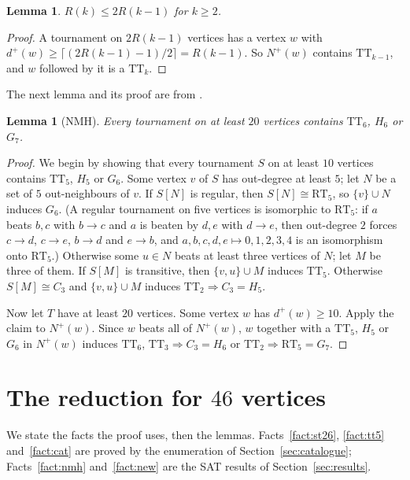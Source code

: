 \documentclass[11pt]{amsart}
\newtheorem{lemma}[theorem]{Lemma}
\theoremstyle{definition}
\theoremstyle{remark}
\newcommand{\TT}[1]{\mathrm{TT}_{#1}}
\newcommand{\RT}{\mathrm{RT}_5}
\newcommand{\dom}{\Rightarrow}
\newcommand{\Np}{N^{+}}
\newcommand{\dpl}{d^{+}}
\begin{document}
\begin{lemma}\label{lem:double}
$R(k) \le 2R(k-1)$ for $k \ge 2$.
\end{lemma}

\begin{proof}
A tournament on $2R(k-1)$ vertices has a vertex $w$ with
$\dpl(w) \ge \lceil (2R(k-1)-1)/2 \rceil = R(k-1)$. So $\Np(w)$ contains
$\TT{k-1}$, and $w$ followed by it is a $\TT{k}$.
\end{proof}

The next lemma and its proof are from \cite[\S5.2.2]{NMH22}.

\begin{lemma}[NMH]\label{lem:h6g7}
Every tournament on at least $20$ vertices contains $\TT{6}$, $H_6$ or $G_7$.
\end{lemma}

\begin{proof}
We begin by showing that every tournament $S$ on at least $10$ vertices contains
$\TT{5}$, $H_5$ or $G_6$. Some vertex $v$ of $S$ has out-degree at least $5$;
let $N$ be a set of $5$ out-neighbours of $v$. If $S[N]$ is regular, then
$S[N] \cong \RT$, so $\{v\}\cup N$ induces $G_6$. (A regular tournament on five
vertices is isomorphic to $\RT$: if $a$ beats $b,c$ with $b \to c$ and $a$ is
beaten by $d,e$ with $d \to e$, then out-degree $2$ forces $c \to d$,
$c \to e$, $b \to d$ and $e \to b$, and $a,b,c,d,e \mapsto 0,1,2,3,4$ is an
isomorphism onto $\RT$.) Otherwise some $u \in N$ beats at least three
vertices of $N$; let $M$ be three of them. If $S[M]$ is transitive, then
$\{v,u\}\cup M$ induces $\TT{5}$. Otherwise $S[M] \cong C_3$ and
$\{v,u\} \cup M$ induces $\TT{2} \dom C_3 = H_5$.

Now let $T$ have at least $20$ vertices. Some vertex $w$ has
$\dpl(w) \ge 10$. Apply the claim to $\Np(w)$. Since $w$ beats all of
$\Np(w)$, $w$ together with a $\TT{5}$, $H_5$ or $G_6$ in $\Np(w)$ induces
$\TT{6}$, $\TT{3}\dom C_3 = H_6$ or $\TT{2} \dom \RT = G_7$.
\end{proof}

\section{The reduction for $46$ vertices}\label{sec:reduction}

We state the facts the proof uses, then the lemmas. Facts~\ref{fact:st26},
\ref{fact:tt5} and~\ref{fact:cat} are proved by the enumeration of
Section~\ref{sec:catalogue}; Facts~\ref{fact:nmh} and~\ref{fact:new} are the
SAT results of Section~\ref{sec:results}.
\end{document}
